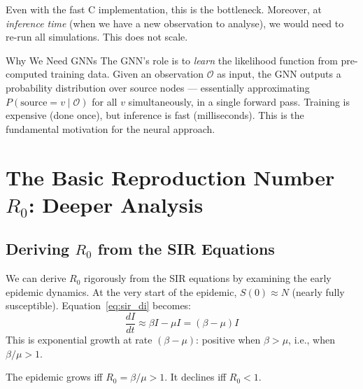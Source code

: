 Even with the fast C implementation, this is the bottleneck. Moreover, at \emph{inference time} (when we have a new observation to analyse), we would need to re-run all simulations. This does not scale.

\begin{keyinsight}{Why We Need GNNs}
The GNN's role is to \emph{learn} the likelihood function from pre-computed training data. Given an observation $\mathcal{O}$ as input, the GNN outputs a probability distribution over source nodes --- essentially approximating $P(\text{source} = v \mid \mathcal{O})$ for all $v$ simultaneously, in a single forward pass. Training is expensive (done once), but inference is fast (milliseconds). This is the fundamental motivation for the neural approach.
\end{keyinsight}

\section{The Basic Reproduction Number $R_0$: Deeper Analysis}
\label{sec:r0_deep}

\subsection{Deriving $R_0$ from the SIR Equations}

We can derive $R_0$ rigorously from the SIR equations by examining the early epidemic dynamics. At the very start of the epidemic, $S(0) \approx N$ (nearly fully susceptible). Equation~\eqref{eq:sir_di} becomes:
\[
\frac{dI}{dt} \approx \beta I - \mu I = (\beta - \mu) I
\]
This is exponential growth at rate $(\beta - \mu)$: positive when $\beta > \mu$, i.e., when $\beta/\mu > 1$.

The epidemic grows iff $R_0 = \beta/\mu > 1$. It declines iff $R_0 < 1$.

